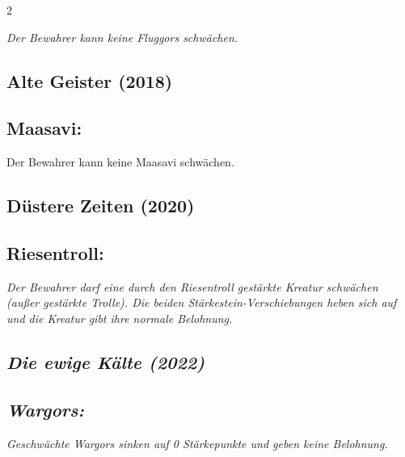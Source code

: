 \documentclass[10pt, a4paper, oneside]{book}
\newcommand{\fan}[1]{\textit{#1}}
\begin{document}
\begin{multicols*}{2}
\begin{bgcolor}[color-bb]
\fan{Der Bewahrer kann keine Fluggors schwächen.}

\end{bgcolor}



\begin{bgcolor}[color-ag]
\section{Alte Geister (2018)}

\subsection{Maasavi:}

Der Bewahrer kann keine Maasavi schwächen.
\supercite{ag-begleitheft}

\end{bgcolor}



\begin{bgcolor}[color-dz]
\section{Düstere Zeiten (2020)}


\subsection{Riesentroll:}

\fan{Der Bewahrer darf eine durch den Riesentroll gestärkte Kreatur schwächen (außer gestärkte Trolle). Die beiden Stärkestein-Verschiebungen heben sich auf und die Kreatur gibt ihre normale Belohnung.}

\end{bgcolor}








\begin{bgcolor}
\section{\fan{Die ewige Kälte (2022)}}


\subsection{\fan{Wargors:}}

\fan{Geschwächte Wargors sinken auf 0 Stärkepunkte und geben keine Belohnung. }



\end{bgcolor}
\end{multicols*}
\end{document}
